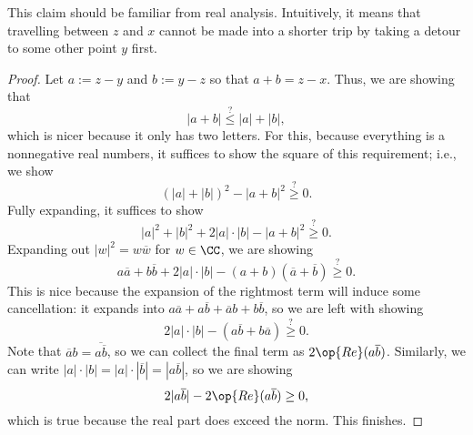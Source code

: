 This claim should be familiar from real analysis. Intuitively, it means that travelling between $z$ and $x$ cannot be made into a shorter trip by taking a detour to some other point $y$ first.
\begin{proof}
	Let $a:=z-y$ and $b:=y-z$ so that $a+b=z-x$. Thus, we are showing that
	\[|a+b|\stackrel?\le|a|+|b|,\]
	which is nicer because it only has two letters. For this, because everything is a nonnegative real numbers, it suffices to show the square of this requirement; i.e., we show
	\[(|a|+|b|)^2-|a+b|^2\stackrel?\ge0.\]
	Fully expanding, it suffices to show
	\[|a|^2+|b|^2+2|a|\cdot|b|-|a+b|^2\stackrel?\ge0.\]
	Expanding out $|w|^2=w\overline w$ for $w\in\CC$, we are showing
	\[a\overline a+b\overline b+2|a|\cdot|b|-(a+b)(\overline a+\overline b)\stackrel?\ge0.\]
	This is nice because the expansion of the rightmost term will induce some cancellation: it expands into $a\overline a+a\overline b+\overline ab+b\overline b$, so we are left with showing
	\[2|a|\cdot|b|-(a\overline b+b\overline a)\stackrel?\ge0.\]
	Note that $\overline ab=\overline{a\overline b}$, so we can collect the final term as $2\op{Re}(a\overline b)$. Similarly, we can write $|a|\cdot|b|=|a|\cdot|\overline b|=|a\overline b|$, so we are showing
	\[2|a\overline b|-2\op{Re}(a\overline b)\ge0,\]
	which is true because the real part does exceed the norm. This finishes.
\end{proof}
